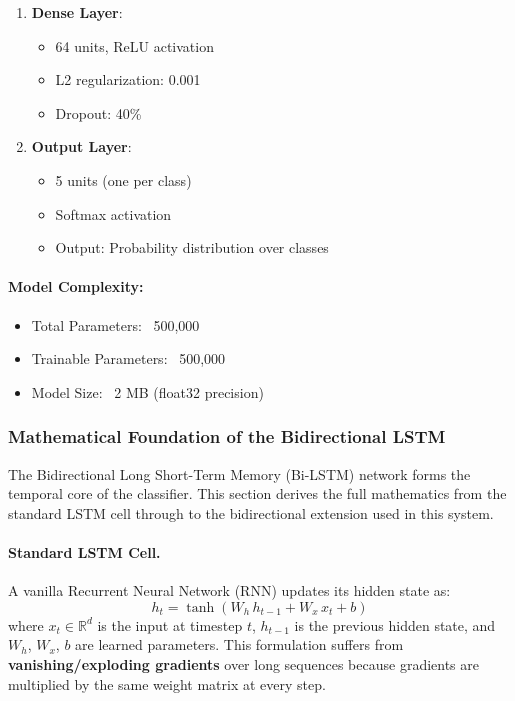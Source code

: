 \documentclass[12pt,a4paper]{article}
\begin{document}
\begin{enumerate}
    \item \textbf{Dense Layer}:
    \begin{itemize}
        \item 64 units, ReLU activation
        \item L2 regularization: 0.001
        \item Dropout: 40\%
    \end{itemize}
    
    \item \textbf{Output Layer}:
    \begin{itemize}
        \item 5 units (one per class)
        \item Softmax activation
        \item Output: Probability distribution over classes
    \end{itemize}
\end{enumerate}

\paragraph{Model Complexity:}
\begin{itemize}
    \item Total Parameters: ~500,000
    \item Trainable Parameters: ~500,000
    \item Model Size: ~2 MB (float32 precision)
\end{itemize}

\subsubsection{Mathematical Foundation of the Bidirectional LSTM}

The Bidirectional Long Short-Term Memory (Bi-LSTM) network forms the temporal
core of the classifier. This section derives the full mathematics from the standard
LSTM cell through to the bidirectional extension used in this system.

\paragraph{Standard LSTM Cell.}

A vanilla Recurrent Neural Network (RNN) updates its hidden state as:
\begin{equation}
    h_t = \tanh\!\left(W_h\,h_{t-1} + W_x\,x_t + b\right)
\end{equation}
where $x_t \in \mathbb{R}^{d}$ is the input at timestep $t$, $h_{t-1}$ is the
previous hidden state, and $W_h$, $W_x$, $b$ are learned parameters.
This formulation suffers from \textbf{vanishing/exploding gradients} over long
sequences because gradients are multiplied by the same weight matrix at every step.
\end{document}
